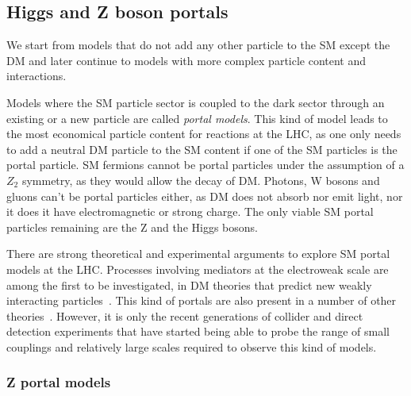\subsection{Higgs and Z boson portals}
\label{sec:HZPortalModels}

We start from models that do not add any other particle to the SM except the DM and later continue to models with more complex particle content and interactions. 

Models where the SM particle sector is coupled to the dark sector through an existing or a new particle are called \textit{portal models}. This kind of model leads to the most economical particle content for reactions at the LHC, as one only needs to add a neutral DM particle to the SM content if one of the SM particles is the portal particle. SM fermions cannot be portal particles under the assumption of a $Z_2$ symmetry, as they would allow the decay of DM. Photons, W bosons and gluons can't be portal particles either, as DM does not absorb nor emit light, nor it does it have electromagnetic or strong charge. The only viable SM portal particles remaining are the Z and the Higgs bosons. 

There are strong theoretical and experimental arguments to explore SM portal models at the LHC. 
Processes involving mediators at the electroweak scale are among the first to be investigated, in DM theories that predict new weakly interacting particles~\cite{Cotta:2012nj}. This kind of portals are also present in a number of other theories~\cite{Arcadi:2014lta}. %
However, it is only the recent generations of collider and direct detection experiments that have started being able to probe the range of small couplings and relatively large scales required to observe this kind of models. 

\subsubsection{Z portal models}

